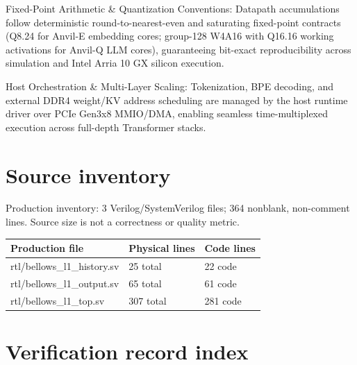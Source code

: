 \documentclass[11pt,a4paper]{article}
\begin{document}
Fixed-Point Arithmetic \& Quantization Conventions: Datapath accumulations follow deterministic round-to-nearest-even and saturating fixed-point contracts (\allowbreak{}Q8.24 for Anvil-E embedding cores; group-128 W4A16 with Q16.16 working activations for Anvil-Q LLM cores)\allowbreak{},\allowbreak{} guaranteeing bit-exact reproducibility across simulation and Intel Arria 10 GX silicon execution.


Host Orchestration \& Multi-Layer Scaling: Tokenization,\allowbreak{} BPE decoding,\allowbreak{} and external DDR4 weight/\allowbreak{}KV address scheduling are managed by the host runtime driver over PCIe Gen3x8 MMIO/\allowbreak{}DMA,\allowbreak{} enabling seamless time-multiplexed execution across full-depth Transformer stacks.


\appendix{}\section{Source inventory}

Production inventory: 3 Verilog/\allowbreak{}SystemVerilog files; 364 nonblank,\allowbreak{} non-comment lines. Source size is not a correctness or quality metric.

{\small\renewcommand{\arraystretch}{1.18}\begin{longtable}{@{}L{0.55\textwidth}|L{0.18\textwidth}|L{0.18\textwidth}@{}}\toprule

\textbf{Production file} & \textbf{Physical lines} & \textbf{Code lines}\\\midrule\endhead

rtl/\allowbreak{}bellows\_\allowbreak{}l1\_\allowbreak{}history.sv & 25 total & 22 code\\[2pt]\hline

rtl/\allowbreak{}bellows\_\allowbreak{}l1\_\allowbreak{}output.sv & 65 total & 61 code\\[2pt]\hline

rtl/\allowbreak{}bellows\_\allowbreak{}l1\_\allowbreak{}top.sv & 307 total & 281 code\\[2pt]\hline

\bottomrule\end{longtable}}

\section{Verification record index}
\end{document}
